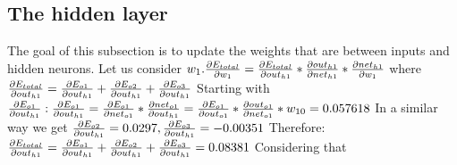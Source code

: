 \documentclass[12pt]{article}
\begin{document}
\subsection{The hidden layer}
The goal of this subsection is to update the weights that are between inputs and hidden neurons. Let us consider
\begin{math}w_1.
\newline\newline
\frac{\partial E_{total}}{\partial w_{1}} = \frac{\partial E_{total}}{\partial out_{h1}} * \frac{\partial out_{h1}}{\partial net_{h1}} * \frac{\partial net_{h1}}{\partial w_{1}}
\newline\newline
\end{math}
where
\begin{math}
\frac{\partial E_{total}}{\partial out_{h1}} = \frac{\partial E_{o1}}{\partial out_{h1}} + \frac{\partial E_{o2}}{\partial out_{h1}} + \frac{\partial E_{o3}}{\partial out_{h1}}
\newline\newline
\end{math}
Starting with
\begin{math}
\frac{\partial E_{o1}}{\partial out_{h1}}:
\newline\newline
\frac{\partial E_{o1}}{\partial out_{h1}} = \frac{\partial E_{o1}}{\partial net_{o1}} * \frac{\partial net_{o1}}{\partial out_{h1}} = \frac{\partial E_{o1}}{\partial out_{o1}} * \frac{\partial out_{o1}}{\partial net_{o1}} * w_{10} = 0.057618
\newline\newline
\end{math}
In a similar way we get
\begin{math}
\frac{\partial E_{o2}}{\partial out_{h1}} = 0.0297, \frac{\partial E_{o3}}{\partial out_{h1}} = -0.00351
\newline\newline
\end{math}
Therefore:
\begin{math}
\newline\newline
\frac{\partial E_{total}}{\partial out_{h1}} = \frac{\partial E_{o1}}{\partial out_{h1}} + \frac{\partial E_{o2}}{\partial out_{h1}} + \frac{\partial E_{o3}}{\partial out_{h1}} = 0.08381
\newline\newline
\end{math}
Considering that
\end{document}

